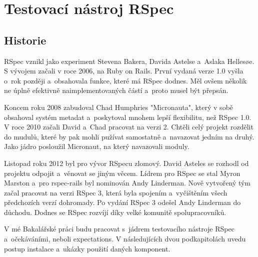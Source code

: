 \section {Testovací nástroj RSpec}
\subsection{Historie}
\par RSpec\cite{davidchelimsky2015} vznikl jako experiment Stevena Bakera, Davida Astelse a~Aslaka Hellesøe. S vývojem začali v roce 2006, na Ruby on Rails. První vydaná verze 1.0 vyšla o~rok později a~obsahovala funkce, které má RSpec dodnes. Měl ovšem několik ne úplně efektivně naimplementovaných částí a~proto musel být přepsán.
\par Koncem roku 2008 zabudoval Chad Humphries "Micronauta", který v sobě obsahoval systém metadat a~poskytoval mnohem lepší flexibilitu, než RSpec 1.0. V roce 2010 začali David a~Chad pracovat na verzi 2. Chtěli celý projekt rozdělit do mudulů, které by pak mohli pužívat samostatně a~navazovat jedním na druhý. Jako jádro posloužil Micronaut, na který navazovali moduly.
\par Listopad roku 2012 byl pro vývor RSpecu zlomový. David Asteles se rozhodl od projektu odpojit a~věnovat se jiným věcem. Lídrem pro RSpec se stal Myron Marston a~pro rspec-rails byl nominován Andy Linderman. Nově vytvořený tým začal pracovat na verzi RSpec 3, která byla spojením a~vyčištěním všech předchozích verzí dohromady. Po vydání RSpec 3 odešel Andy Linderman do důchodu. Dodnes se RSpec rozvíjí díky velké komunitě spolupracovníků.
\par V mé Bakalářské práci budu pracovat s~jádrem testovacího nástroje RSpec a~očekáváními, neboli expectations. V následujících dvou podkapitolách uvedu postup instalace a~ukázky použití daných komponent.


